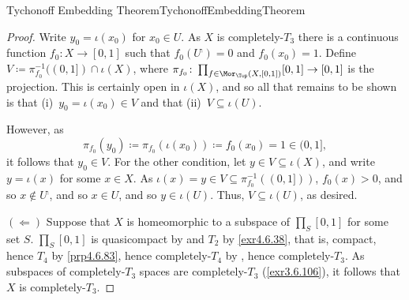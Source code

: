 \begin{thm}{Tychonoff Embedding Theorem}{TychonoffEmbeddingTheorem}
\begin{proof}
Write $y_0=\iota (x_0)$ for $x_0\in U$.  As $X$ is completely-$T_3$ there is a continuous function $f_0\colon X\rightarrow [0,1]$ such that $f_0(U^{\comp})=0$ and $f_0(x_0)=1$.  Define $V\coloneqq \pi _{f_0}^{-1}((0,1])\cap \iota (X)$, where $\pi _{f_0}\colon \prod _{f\in  \Mor _{\Top}(X,[0,1])}[0,1]\rightarrow [0,1]$ is the projection.  This is certainly open in $\iota (X)$, and so all that remains to be shown is that (i)~$y_0=\iota (x_0)\in V$ and that (ii)~$V\subseteq \iota (U)$.

However, as
\begin{equation}
\pi _{f_0}(y_0)\coloneqq \pi _{f_0}(\iota (x_0))\coloneqq f_0(x_0)=1\in (0,1],
\end{equation}
it follows that $y_0\in V$.  For the other condition, let $y\in V\subseteq \iota (X)$, and write $y=\iota (x)$ for some $x\in X$.  As $\iota (x)=y\in V\subseteq \pi _{f_0}^{-1}((0,1]))$, $f_0(x)>0$, and so $x\notin U^{\comp}$, and so $x\in U$, and so $y\in \iota (U)$.  Thus, $V\subseteq \iota (U)$, as desired.

\blankline
\noindent
$(\Leftarrow )$ Suppose that $X$ is homeomorphic to a subspace of $\prod _S[0,1]$ for some set $S$.  $\prod _S[0,1]$ is quasicompact by  and $T_2$ by \cref{exr4.6.38}, that is, compact, hence $T_4$ by \cref{prp4.6.83}, hence completely-$T_4$ by , hence completely-$T_3$.  As subspaces of completely-$T_3$ spaces are completely-$T_3$ (\cref{exr3.6.106}), it follows that $X$ is completely-$T_3$.
\end{proof}
\end{thm}

